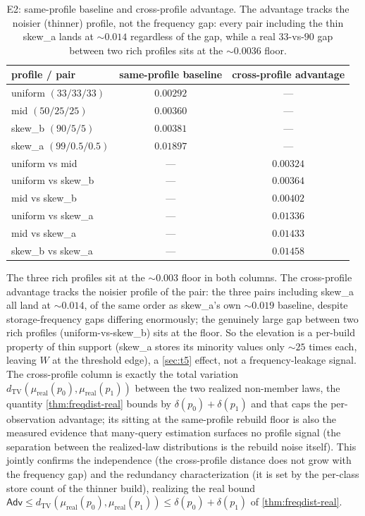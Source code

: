 \documentclass[11pt]{article}
\theoremstyle{definition}
\theoremstyle{plain}
\theoremstyle{remark}
\newcommand{\TV}{d_{\mathrm{TV}}}
\newcommand{\W}{W}                          %
\newcommand{\Adv}{\mathsf{Adv}}             %
\newcommand{\lawreal}{\mu_{\mathrm{real}}}  %
\begin{document}
\begin{table}[t]
  \centering
  \caption{E2: same-profile baseline and cross-profile advantage. The advantage tracks the
  noisier (thinner) profile, not the frequency gap: every pair including the thin skew\_a
  lands at $\sim 0.014$ regardless of the gap, while a real $33$-vs-$90$ gap between two
  rich profiles sits at the $\sim 0.0036$ floor.}
  \label{tab:e2}
  \begin{tabular}{lcc}
    \toprule
    profile / pair & same-profile baseline & cross-profile advantage \\
    \midrule
    uniform $(33/33/33)$ & $0.00292$ & --- \\
    mid $(50/25/25)$     & $0.00360$ & --- \\
    skew\_b $(90/5/5)$   & $0.00381$ & --- \\
    skew\_a $(99/0.5/0.5)$ & $0.01897$ & --- \\
    \midrule
    uniform vs mid       & --- & $0.00324$ \\
    uniform vs skew\_b   & --- & $0.00364$ \\
    mid vs skew\_b       & --- & $0.00402$ \\
    uniform vs skew\_a   & --- & $0.01336$ \\
    mid vs skew\_a       & --- & $0.01433$ \\
    skew\_b vs skew\_a   & --- & $0.01458$ \\
    \bottomrule
  \end{tabular}
\end{table}

The three rich profiles sit at the $\sim 0.003$ floor in both columns. The cross-profile
advantage tracks the noisier profile of the pair: the three pairs including skew\_a all
land at $\sim 0.014$, of the same order as skew\_a's own $\sim 0.019$ baseline, despite
storage-frequency gaps differing enormously; the genuinely large gap between two rich
profiles (uniform-vs-skew\_b) sits at the floor. So the elevation is a per-build property
of thin support (skew\_a stores its minority values only $\sim 25$ times each, leaving $\W$
at the threshold edge), a \cref{sec:t5} effect, not a frequency-leakage signal. The
cross-profile column is exactly the total variation $\TV(\lawreal(p_0), \lawreal(p_1))$
between the two realized non-member laws, the quantity \cref{thm:freqdist-real} bounds by
$\delta(p_0)+\delta(p_1)$ and that caps the per-observation advantage; its sitting at the
same-profile rebuild floor is also the measured evidence that many-query estimation
surfaces no profile signal (the separation between the realized-law distributions is the
rebuild noise itself).
This jointly confirms the independence (the cross-profile distance does not grow with the
frequency gap) and the redundancy characterization (it is set by the per-class store count
of the thinner build), realizing the real bound
$\Adv \le \TV(\lawreal(p_0), \lawreal(p_1)) \le \delta(p_0)+\delta(p_1)$ of
\cref{thm:freqdist-real}.
\end{document}
